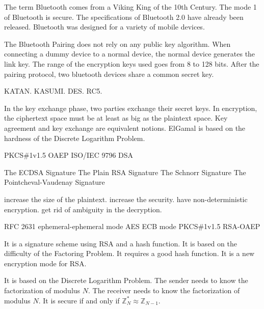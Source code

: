 {The term Bluetooth comes from a Viking King of the 10th Century.}
{The mode 1 of Bluetooth is secure.}
{The specifications of Bluetooth 2.0 have already been released.}
{Bluetooth was designed for a variety of mobile devices.}

 {The Bluetooth Pairing does not rely on any public key algorithm.}
 {When connecting a dummy device to a normal device, the normal device generates the link key.}
 {The range of the encryption keys used goes from 8 to 128 bits.}
 {After the pairing protocol, two bluetooth devices share a common secret key.}

 {KATAN.}
 {KASUMI.}
 {DES.}
 {RC5.}

{In the  key exchange phase, two parties exchange their secret keys.}
{In encryption, the ciphertext space must be at least as big as the plaintext space.}
{Key agreement and key exchange are equivalent  notions.}
{ElGamal is based on the hardness of the Discrete Logarithm Problem. }

{PKCS{\#}1v1.5}
{OAEP}
{ISO/IEC 9796}
{DSA}

{The ECDSA Signature }
{The Plain RSA Signature}
{The Schnorr Signature}
{The Pointcheval-Vaudenay Signature}

{increase the size of the plaintext.}
{increase the security.}
{have non-deterministic encryption.}
{get rid of ambiguity in the decryption.}

{RFC 2631 ephemeral-ephemeral mode}
{AES ECB mode}
{PKCS{\#}1v1.5 }
{RSA-OAEP }

{It is a signature scheme using RSA and a hash function.}
{It is based on the difficulty of the Factoring Problem.}
{It requires a good hash function.}
{It is a new encryption mode for RSA.}

{It is based on the Discrete Logarithm Problem.}
{The sender needs to know the factorization of modulus $N$.}
{The receiver needs to know the factorization of modulus $N$.}
{It is secure if and only if $\mathbb{Z}_{N}^* \approx \mathbb{Z}_{N-1}$.}

